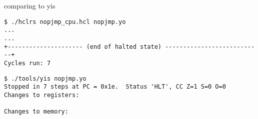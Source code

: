 
\begin{frame}[fragile,label=compareNopJmp]{comparing to yis}
\begin{Verbatim}[fontsize=\fontsize{8}{9}\selectfont]
$ ./hclrs nopjmp_cpu.hcl nopjmp.yo
...
...
+--------------------- (end of halted state) ---------------------------+
Cycles run: 7
\end{Verbatim}
\begin{Verbatim}[fontsize=\fontsize{8}{9}\selectfont]
$ ./tools/yis nopjmp.yo
Stopped in 7 steps at PC = 0x1e.  Status 'HLT', CC Z=1 S=0 O=0
Changes to registers:

Changes to memory:
\end{Verbatim}
\end{frame}
